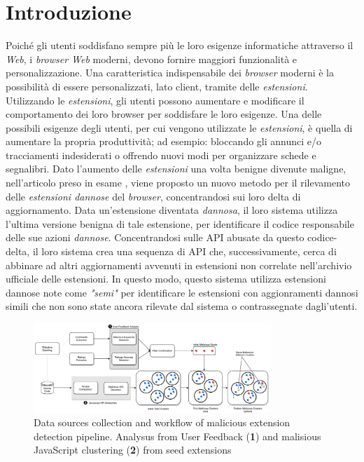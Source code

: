 \documentclass[ 11pt, oneside, italian, onehalfspacing, headsepline, ]{MastersDoctoralThesis}
\begin{document}

{\chapter{Introduzione}}

Poiché gli utenti soddisfano sempre più le loro esigenze informatiche attraverso il \textit{Web}, i \textit{browser Web} moderni, devono fornire maggiori funzionalità e personalizzazione. \newline 
Una caratteristica indispensabile dei \textit{browser} moderni è la possibilità di essere personalizzati, lato client, tramite delle \textit{estensioni}. \newline
Utilizzando le \textit{estensioni}, gli utenti possono aumentare e modificare il comportamento dei loro browser per soddisfare le loro esigenze. \newline
Una delle possibili esigenze degli utenti, per cui vengono utilizzate le \textit{estensioni}, è quella di aumentare la propria produttività; ad esempio: bloccando gli annunci e/o tracciamenti indesiderati o offrendo nuovi modi per organizzare schede e segnalibri. \newline 
Dato l'aumento delle \textit{estensioni} una volta benigne divenute maligne, nell'articolo preso in esame \citep{ReferenceArticle}, viene proposto un nuovo metodo per il rilevamento delle \textit{estensioni dannose} del \textit{browser}, concentrandosi sui loro delta di aggiornamento. Data un'estensione diventata \textit{dannosa}, il loro sistema utilizza l'ultima versione benigna di tale estensione, per identificare il codice responsabile delle sue azioni \textit{dannose}. Concentrandosi sulle API abusate da questo codice-delta, il loro sistema crea una sequenza di API che, successivamente, cerca di abbinare ad altri aggiornamenti avvenuti in estensioni non correlate nell'archivio ufficiale delle estensioni. \newline
In questo modo, questo sistema utilizza estensioni dannose note come \textit{"semi"} per identificare le estensioni con aggionramenti dannosi simili che non sono state ancora rilevate dal sistema o contrassegnate dagli'utenti. \newline

\begin{figure}[hbt!]
	\caption{Data sources collection and workflow of malicious extension detection pipeline. Analysus from User Feedback (\textbf{1}) and malisious JavaScript clustering (\textbf{2}) from seed extensions}\label{fig:summarydiagram}
	\centering
	\includegraphics[width=0.8\textwidth]{Summary_diagram.png}
\end{figure}
\end{document}
